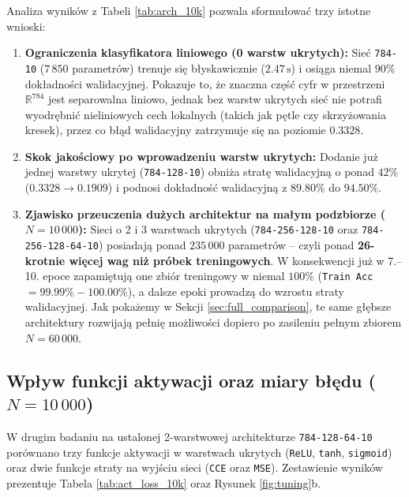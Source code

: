 \documentclass{article}
\begin{document}
Analiza wyników z Tabeli \ref{tab:arch_10k} pozwala sformułować trzy istotne wnioski:
\begin{enumerate}
    \item \textbf{Ograniczenia klasyfikatora liniowego (0 warstw ukrytych):} Sieć \texttt{784-10} ($7\,850$ parametrów) trenuje się błyskawicznie ($2.47\,\text{s}$) i osiąga niemal $90\%$ dokładności walidacyjnej. Pokazuje to, że znaczna część cyfr w przestrzeni $\mathbb{R}^{784}$ jest separowalna liniowo, jednak bez warstw ukrytych sieć nie potrafi wyodrębnić nieliniowych cech lokalnych (takich jak pętle czy skrzyżowania kresek), przez co błąd walidacyjny zatrzymuje się na poziomie $0.3328$.
    \item \textbf{Skok jakościowy po wprowadzeniu warstw ukrytych:} Dodanie już jednej warstwy ukrytej (\texttt{784-128-10}) obniża stratę walidacyjną o ponad $42\%$ ($0.3328 \to 0.1909$) i podnosi dokładność walidacyjną z $89.80\%$ do $94.50\%$.
    \item \textbf{Zjawisko przeuczenia dużych architektur na małym podzbiorze ($N = 10\,000$):} Sieci o 2 i 3 warstwach ukrytych (\texttt{784-256-128-10} oraz \texttt{784-256-128-64-10}) posiadają ponad $235\,000$ parametrów -- czyli ponad \textbf{26-krotnie więcej wag niż próbek treningowych}. W konsekwencji już w 7.--10. epoce zapamiętują one zbiór treningowy w niemal $100\%$ (\texttt{Train Acc} $= 99.99\% - 100.00\%$), a dalsze epoki prowadzą do wzrostu straty walidacyjnej. Jak pokażemy w Sekcji \ref{sec:full_comparison}, te same głębsze architektury rozwijają pełnię możliwości dopiero po zasileniu pełnym zbiorem $N = 60\,000$.
\end{enumerate}

\subsection{Wpływ funkcji aktywacji oraz miary błędu ($N = 10\,000$)}

W drugim badaniu na ustalonej 2-warstwowej architekturze \texttt{784-128-64-10} porównano trzy funkcje aktywacji w warstwach ukrytych (\texttt{ReLU}, \texttt{tanh}, \texttt{sigmoid}) oraz dwie funkcje straty na wyjściu sieci (\texttt{CCE} oraz \texttt{MSE}). Zestawienie wyników prezentuje Tabela \ref{tab:act_loss_10k} oraz Rysunek \ref{fig:tuning}b.
\end{document}
